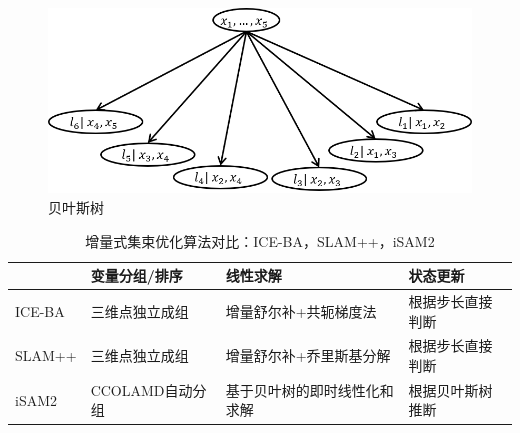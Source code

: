 \begin{figure}[htb!]
    \centering
    \includegraphics[width=\textwidth]{figs/bayes_tree.png}
    \caption{贝叶斯树}
\end{figure}

\begin{table}[htb!]
    \centering
    \caption{增量式集束优化算法对比：ICE-BA，SLAM++，iSAM2}
    \vspace{6pt}
    \begin{tabularx}{\textwidth}{lXXX}
               & 变量分组/排序   & 线性求解                     & 状态更新          \\ \hline
        ICE-BA & 三维点独立成组  & 增量舒尔补+共轭梯度法        & 根据步长直接判断  \\
        SLAM++ & 三维点独立成组  & 增量舒尔补+乔里斯基分解      & 根据步长直接判断  \\
        iSAM2  & CCOLAMD自动分组 & 基于贝叶树的即时线性化和求解 & 根据贝叶斯树推断  \\
    \end{tabularx}
    \label{tab:comp}
\end{table}
